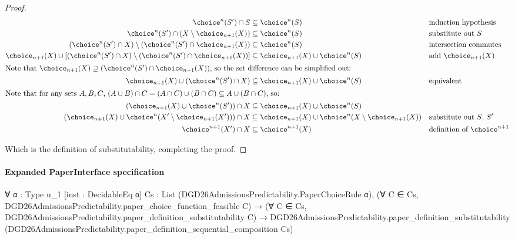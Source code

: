 \documentclass[10pt]{article}
\begin{document}
\begin{ReviewVerbatim}
\begin{proof}
    \begin{align*}
        \choice^n(S') \cap S & \subseteq \choice^n(S) && \text{induction hypothesis} \\
        \choice^n(S') \cap \left(X \setminus \choice_{n+1}(X)\right) & \subseteq \choice^n(S) &&  \text{substitute out $S$}\\      \left(\choice^n(S') \cap X\right) \setminus \left(\choice^n(S') \cap  \choice_{n+1}(X)\right) & \subseteq \choice^n(S) && \text{intersection commutes}\\
        \choice_{n+1}(X) \cup \left[\left(\choice^n(S') \cap X\right) \setminus \left(\choice^n(S') \cap  \choice_{n+1}(X)\right)\right] & \subseteq \choice_{n+1}(X) \cup \choice^n(S) && \text{add $\choice_{n+1}(X)$} \\ \intertext{Note that $\choice_{n+1}(X) \supseteq\left(\choice^n(S') \cap  \choice_{n+1}(X)\right)$, so the set difference can be simplified out:}
        \choice_{n+1}(X) \cup \left(\choice^n(S') \cap X\right) & \subseteq \choice_{n+1}(X) \cup \choice^n(S) && \text{equivalent} \\ \intertext{Note that for any sets $A,B,C$, $(A \cup B) \cap C = (A \cap C)\cup (B \cap C) \subseteq A \cup (B \cap C)$, so:
        }
        \left(\choice_{n+1}(X) \cup \choice^n(S') \right) \cap X & \subseteq \choice_{n+1}(X) \cup \choice^n(S) && \text{} \\
        \left(\choice_{n+1}(X) \cup \choice^n(X' \setminus \choice_{n+1}(X')) \right) \cap X & \subseteq \choice_{n+1}(X) \cup \choice^n(X \setminus \choice_{n+1}(X)) &&  \text{substitute out $S$, $S'$}  \\
        \choice^{n+1}(X') \cap X & \subseteq \choice^{n+1}(X) &&  \text{definition of $\choice^{n+1}$}
    \end{align*}

    Which is the definition of substitutability, completing the proof.
\end{proof}
\end{ReviewVerbatim}



\paragraph{Expanded PaperInterface specification}
\begin{ReviewVerbatim}
∀ {α : Type u_1} [inst : DecidableEq α] {Cs : List (DGD26AdmissionsPredictability.PaperChoiceRule α)},
  (∀ C ∈ Cs, DGD26AdmissionsPredictability.paper_choice_function_feasible C) →
    (∀ C ∈ Cs, DGD26AdmissionsPredictability.paper_definition_substitutability C) →
      DGD26AdmissionsPredictability.paper_definition_substitutability
        (DGD26AdmissionsPredictability.paper_definition_sequential_composition Cs)
\end{ReviewVerbatim}
\end{document}

